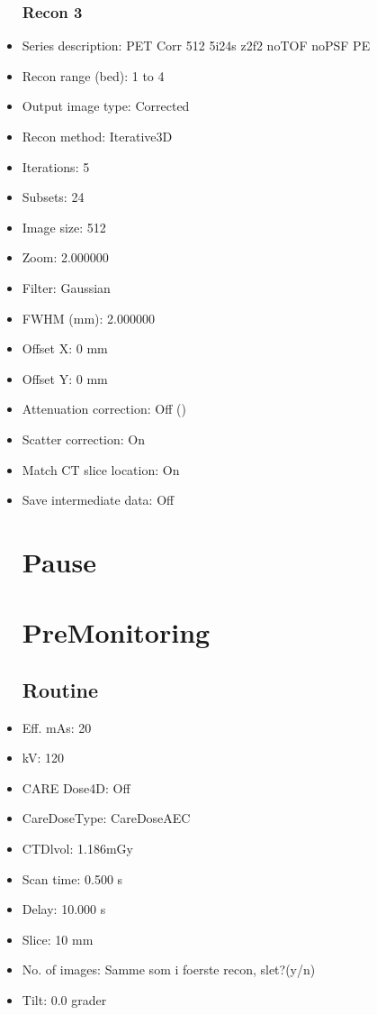 \documentclass[12pt]{article}
\begin{document}
\begin{itemize}
\subsubsection{Recon 3}
\item Series description: PET  Corr 512 5i24s z2f2 noTOF noPSF PE
\item Recon range (bed): 1 to 4
\item Output image type: Corrected
\item Recon method: Iterative3D
\item Iterations: 5
\item Subsets: 24
\item Image size: 512
\item Zoom: 2.000000
\item Filter: Gaussian
\item FWHM (mm): 2.000000
\item Offset X: 0 mm
\item Offset Y: 0 mm
\item Attenuation correction: Off ()
\item Scatter correction: On
\item Match CT slice location: On
\item Save intermediate data: Off
\section{Pause}

\section{PreMonitoring}
\subsection{Routine}
\item Eff. mAs: 20\item kV: 120\item CARE Dose4D: Off\item CareDoseType: CareDoseAEC\item CTDlvol: 1.186mGy\item Scan time: 0.500 s\item Delay: 10.000 s\item Slice: 10 mm\item No. of images: Samme som i foerste recon, slet?(y/n)\item Tilt: 0.0 grader

\end{itemize}
\end{document}
